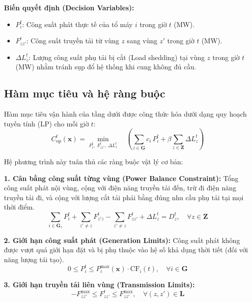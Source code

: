 \textbf{Biến quyết định (Decision Variables):}
\begin{itemize}
    \item $P_i^t$: Công suất phát thực tế của tổ máy $i$ trong giờ $t$ (MW).
    \item $F_{zz'}^t$: Công suất truyền tải từ vùng $z$ sang vùng $z'$ trong giờ $t$ (MW).
    \item $\Delta L_z^t$: Lượng công suất phụ tải bị cắt (Load shedding) tại vùng $z$ trong giờ $t$ (MW) nhằm tránh sụp đổ hệ thống khi cung không đủ cầu.
\end{itemize}

\subsection{Hàm mục tiêu và hệ ràng buộc}

Hàm mục tiêu vận hành của tầng dưới được công thức hóa dưới dạng quy hoạch tuyến tính (LP) cho mỗi giờ $t$:
\begin{equation}
    C_{\text{op}}^t(\mathbf{x}) = \min_{P_i^t,\; F_{zz'}^t,\; \Delta L_z^t} \quad \left( \sum_{i \in \mathbf{G}} c_i \, P_i^t + \beta \sum_{z \in \mathbf{Z}} \Delta L_z^t \right)
    \label{eq:lower_objective}
\end{equation}

Hệ phương trình này tuân thủ các ràng buộc vật lý cơ bản:

\textbf{1. Cân bằng công suất từng vùng (Power Balance Constraint):}
Tổng công suất phát nội vùng, cộng với điện năng truyền tải đến, trừ đi điện năng truyền tải đi, và cộng với lượng cắt tải phải bằng đúng nhu cầu phụ tải tại mọi thời điểm.
\begin{equation}
    \sum_{i \in \mathbf{G}_z} P_i^t + \sum_{z' \ne z} F_{z'z}^t - \sum_{z' \ne z} F_{zz'}^t + \Delta L_z^t = D_z^t, \quad \forall z \in \mathbf{Z}
\end{equation}

\textbf{2. Giới hạn công suất phát (Generation Limits):}
Công suất phát không được vượt quá giới hạn đặt và bị phụ thuộc vào hệ số khả dụng thời tiết (đối với năng lượng tái tạo).
\begin{equation}
    0 \leq P_i^t \leq P_i^{\max}(\mathbf{x}) \cdot \text{CF}_i(t), \quad \forall i \in \mathbf{G}
\end{equation}

\textbf{3. Giới hạn truyền tải liên vùng (Transmission Limits):}
\begin{equation}
    -F_{zz'}^{\max} \leq F_{zz'}^t \leq F_{zz'}^{\max}, \quad \forall (z, z') \in \mathbf{L}
\end{equation}

